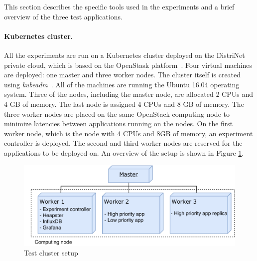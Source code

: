 

This section describes the specific tools used in the experiments and a brief overview of the three test applications. 


\paragraph{Kubernetes cluster.}
\label{cluster}
All the experiments are run on a Kubernetes cluster deployed on the DistriNet private cloud, which is based on the OpenStask platform~\citep{openstack}. Four virtual machines are deployed: one master and three worker nodes. The cluster itself is created using \textit{kubeadm}~\citep{kubeadm}. All of the machines are running the Ubuntu 16.04 operating system. Three of the nodes, including the master node, are allocated 2 CPUs and 4 GB of memory. The last node is assigned 4 CPUs and 8 GB of memory. The three worker nodes are placed on the same OpenStack computing node to minimize latencies between applications running on the nodes. On the first worker node, which is the node with 4 CPUs and 8GB of memory, an experiment controller is deployed. The second and third worker nodes are reserved for the applications to be deployed on. An overview of the setup is shown in Figure \ref{fig:cluster}.

\begin{figure}
\centering
\includegraphics[width=0.85\columnwidth]{Images/Setup/Cluster.pdf}
\caption{Test cluster setup}
\label{fig:cluster} 
\end{figure}


